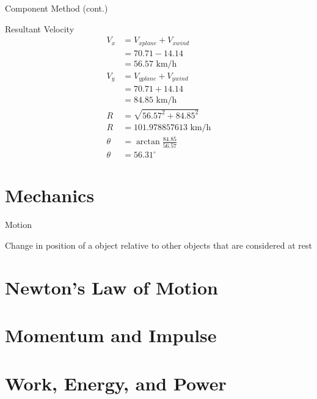 \documentclass[aspectratio=43]{beamer}
\begin{document}
\begin{frame}{Component Method (cont.)}

	Resultant Velocity
	\begin{align*}
		V_x &= V_{xplane} + V_{xwind} \\
		&= 70.71 - 14.14 \\
		& = 56.57 \text{ km/h} \\
		V_y &= V_{yplane} + V_{ywind} \\
		&= 70.71 + 14.14 \\
		&= 84.85 \text{ km/h}\\
		R &= \sqrt{56.57^2 + 84.85^2} \\
		R &= 101.978857613  \text{ km/h}\\
		\theta &= \arctan{\frac{84.85}{56.57}} \\
		\theta &= 56.31^\circ
	\end{align*}
\end{frame}

\section{Mechanics}

\begin{frame}{Motion}
	\begin{definition}
		Change in position of a object relative to other objects that are considered at rest
	\end{definition}
	
\end{frame}


\section{Newton's Law of Motion}

\section{Momentum and Impulse}

\section{Work, Energy, and Power}
\end{document}

